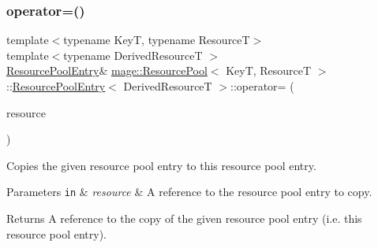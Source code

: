 \subsubsection{\texorpdfstring{operator=()}{operator=()}\hspace{0.1cm}{\footnotesize\ttfamily [1/2]}}
{\footnotesize\ttfamily template$<$typename KeyT, typename ResourceT$>$ \\
template$<$typename Derived\+ResourceT $>$ \\
\hyperlink{structmage_1_1_resource_pool_1_1_resource_pool_entry}{Resource\+Pool\+Entry}\& \hyperlink{classmage_1_1_resource_pool}{mage\+::\+Resource\+Pool}$<$ KeyT, ResourceT $>$\+::\hyperlink{structmage_1_1_resource_pool_1_1_resource_pool_entry}{Resource\+Pool\+Entry}$<$ Derived\+ResourceT $>$\+::operator= (\begin{DoxyParamCaption}\item[{const \hyperlink{structmage_1_1_resource_pool_1_1_resource_pool_entry}{Resource\+Pool\+Entry}$<$ Derived\+ResourceT $>$ \&}]{resource }\end{DoxyParamCaption})\hspace{0.3cm}{\ttfamily [delete]}}

Copies the given resource pool entry to this resource pool entry.


\begin{DoxyParams}[1]{Parameters}
\mbox{\tt in}  & {\em resource} & A reference to the resource pool entry to copy. \\
\hline
\end{DoxyParams}
\begin{DoxyReturn}{Returns}
A reference to the copy of the given resource pool entry (i.\+e. this resource pool entry). 
\end{DoxyReturn}
\hypertarget{structmage_1_1_resource_pool_1_1_resource_pool_entry_ab9de5fdfecd8e19a510541b9353fe854}{}\label{structmage_1_1_resource_pool_1_1_resource_pool_entry_ab9de5fdfecd8e19a510541b9353fe854} 
